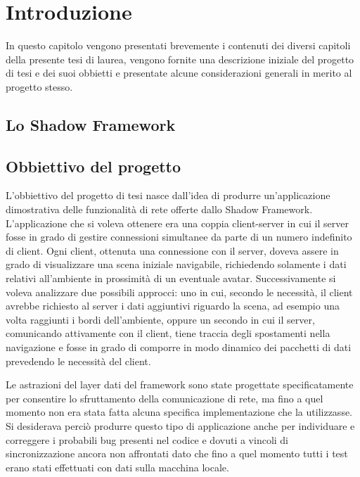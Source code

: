
\chapter{Introduzione}
\label{ch:introduzione}
In questo capitolo vengono presentati brevemente i contenuti dei diversi capitoli della presente tesi di laurea, vengono fornite una descrizione iniziale del progetto di tesi e dei suoi obbietti e presentate alcune considerazioni generali in merito al progetto stesso.

\section{Lo Shadow Framework}
\label{sec:sfintro}

%
%
\section{Obbiettivo del progetto}
\label{sec:obbiettivo}
L'obbiettivo del progetto di tesi nasce dall'idea di produrre un'applicazione dimostrativa delle funzionalità di rete offerte dallo Shadow Framework.
L'applicazione che si voleva ottenere era una coppia client-server in cui il server fosse in grado di gestire connessioni simultanee da parte di un numero indefinito di client. 
Ogni client, ottenuta una connessione con il server, doveva assere in grado di visualizzare una scena iniziale navigabile, richiedendo solamente i dati relativi all'ambiente in prossimità di un eventuale avatar.
Successivamente si voleva analizzare due possibili approcci: uno in cui, secondo le necessità, il client avrebbe richiesto al server i dati aggiuntivi riguardo la scena, ad esempio una volta raggiunti i bordi dell'ambiente, oppure un secondo in cui il server, comunicando attivamente con il client, tiene traccia degli spostamenti nella navigazione e fosse in grado di comporre in modo dinamico dei pacchetti di dati prevedendo le necessità del client.

Le astrazioni del layer dati del framework sono state progettate specificatamente per consentire lo sfruttamento della comunicazione di rete, ma fino a quel momento non era stata fatta alcuna specifica implementazione che la utilizzasse. Si desiderava perciò produrre questo tipo di applicazione anche per individuare e correggere i probabili bug presenti nel codice e dovuti a vincoli di sincronizzazione ancora non affrontati dato che fino a quel momento tutti i test erano stati effettuati con dati sulla macchina locale.

